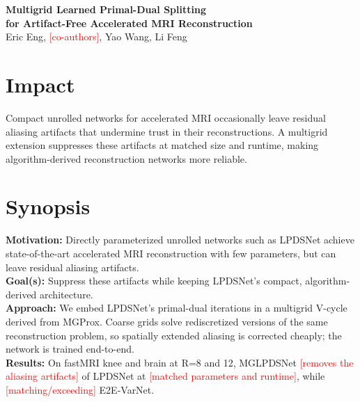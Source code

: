\documentclass[10pt]{article}
\newcommand{\todo}[1]{\textcolor{red}{[#1]}}
\begin{document}
\begin{center}
{\Large\bfseries Multigrid Learned Primal-Dual Splitting\\
for Artifact-Free Accelerated MRI Reconstruction}\\[6pt]
Eric Eng, \todo{co-authors}, Yao Wang, Li Feng
\end{center}

\section*{Impact}
Compact unrolled networks for accelerated MRI occasionally leave residual aliasing artifacts that
undermine trust in their reconstructions. A multigrid extension suppresses these artifacts at
matched size and runtime, making algorithm-derived reconstruction networks more reliable.

\section*{Synopsis}
\textbf{Motivation:} Directly parameterized unrolled networks such as LPDSNet achieve
state-of-the-art accelerated MRI reconstruction with few parameters, but can leave residual
aliasing artifacts.\\
\textbf{Goal(s):} Suppress these artifacts while keeping LPDSNet's compact, algorithm-derived
architecture.\\
\textbf{Approach:} We embed LPDSNet's primal-dual iterations in a multigrid V-cycle derived from
MGProx. Coarse grids solve rediscretized versions of the same reconstruction problem, so spatially
extended aliasing is corrected cheaply; the network is trained end-to-end.\\
\textbf{Results:} On fastMRI knee and brain at R=8 and 12, MGLPDSNet \todo{removes the aliasing
artifacts} of LPDSNet at \todo{matched parameters and runtime}, while \todo{matching/exceeding}
E2E-VarNet.

\end{document}
